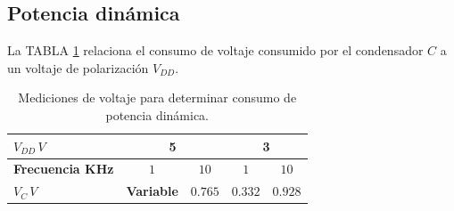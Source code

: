 \documentclass[twocolumn]{IEEEtran}
\begin{document}
\subsection{Potencia dinámica}
\noindent
La TABLA \ref{tab8} relaciona el consumo de voltaje consumido por el condensador $C$ a un voltaje de polarización $V_{DD}$.
\begin{table}[H]
  \caption{Mediciones de voltaje para determinar consumo de potencia dinámica.}
    \begin{tabular}{|l|c|c|c|c|}\hline
      $V_{DD}\, V$ & \multicolumn{2}{c|}{\textbf{5}}  & \multicolumn{2}{c|}{\textbf{3}} \\ \hline
      \textbf{Frecuencia KHz} & $1$ & $10$ & $1$ & $10$ \\ \hline
      $V_C\, V$ & \textbf{Variable} & $0.765$ & $0.332$ & $0.928$ \\ \hline
    \end{tabular}
  \label{tab8}
\end{table}
\end{document}

